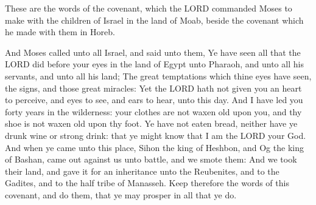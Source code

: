  These are the words of the covenant, which the LORD
commanded Moses to make with the children of Israel in the land of Moab,
beside the covenant which he made with them in Horeb.

 And Moses called unto all Israel, and said unto them, Ye
have seen all that the LORD did before your eyes in the land of Egypt
unto Pharaoh, and unto all his servants, and unto all his land;
 The great temptations which thine eyes have seen, the
signs, and those great miracles:  Yet the LORD hath not
given you an heart to perceive, and eyes to see, and ears to hear, unto
this day.  And I have led you forty years in the
wilderness: your clothes are not waxen old upon you, and thy shoe is not
waxen old upon thy foot.  Ye have not eaten bread, neither
have ye drunk wine or strong drink: that ye might know that I am the
LORD your God.  And when ye came unto this place, Sihon
the king of Heshbon, and Og the king of Bashan, came out against us unto
battle, and we smote them:  And we took their land, and
gave it for an inheritance unto the Reubenites, and to the Gadites, and
to the half tribe of Manasseh.  Keep therefore the words
of this covenant, and do them, that ye may prosper in all that ye do.

